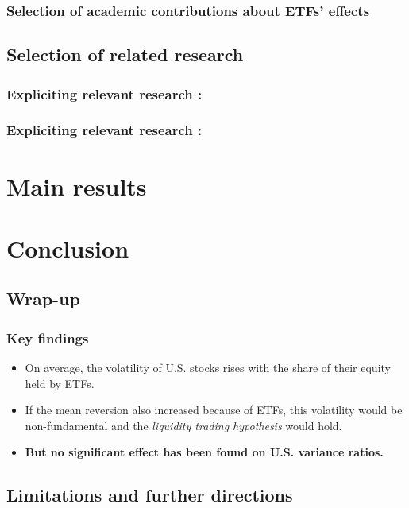 \documentclass[9pt]{beamer}
\begin{document}
\begin{frame}
  \frametitle{Selection of academic contributions about ETFs' effects}
\end{frame}

\subsection{Selection of related research}
\begin{frame}
  \frametitle{Expliciting relevant research : \textcite{Ben-David2018}}
\end{frame}

\begin{frame}
  \frametitle{Expliciting relevant research : \textcite{Israeli2017}}
\end{frame}

\section{Main results}


\section{Conclusion}
\subsection{Wrap-up}

\begin{frame}
  \frametitle{Key findings}
  \begin{itemize}
  \item On average, the volatility of U.S. stocks rises with the share of their equity held by ETFs.
  \item If the mean reversion also increased because of ETFs, this volatility would be non-fundamental and the \emph{liquidity trading hypothesis} would hold.
  \item \textbf{But no significant effect has been found on U.S. variance ratios.}
  \end{itemize}
\end{frame}

\subsection{Limitations and further directions}
\end{document}
